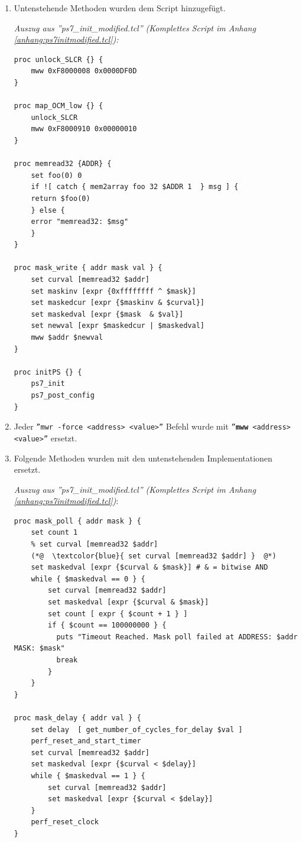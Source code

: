 \begin{enumerate}
\item Untenstehende Methoden wurden dem Script hinzugefügt.

\textit{Auszug aus ''ps7\_init\_modified.tcl'' (Komplettes Script im Anhang \ref{anhang:ps7initmodified.tcl}):}
\lstset{language=tcl}
\begin{lstlisting}[frame=single]
proc unlock_SLCR {} {
	mww 0xF8000008 0x0000DF0D
}

proc map_OCM_low {} {
	unlock_SLCR
	mww 0xF8000910 0x00000010
}

proc memread32 {ADDR} {
    set foo(0) 0
    if ![ catch { mem2array foo 32 $ADDR 1  } msg ] {
	return $foo(0)
    } else {
	error "memread32: $msg"
    }
}

proc mask_write { addr mask val } {
	set curval [memread32 $addr]
	set maskinv [expr {0xffffffff ^ $mask}]
    set maskedcur [expr {$maskinv & $curval}]
	set maskedval [expr {$mask  & $val}]
    set newval [expr $maskedcur | $maskedval]
	mww $addr $newval
}

proc initPS {} {
	ps7_init
	ps7_post_config
}
\end{lstlisting}

\item Jeder \texttt{''mwr -force <address> <value>''} Befehl wurde mit \texttt{''\textbf{mww} <address> <value>''} ersetzt.

\item Folgende Methoden wurden mit den untenstehenden Implementationen ersetzt.

\textit{Auszug aus ''ps7\_init\_modified.tcl'' (Komplettes Script im Anhang \ref{anhang:ps7initmodified.tcl})}:
\lstset{language=tcl}
\begin{lstlisting}[frame=single]
proc mask_poll { addr mask } {
    set count 1
    % set curval [memread32 $addr]
    (*@  \textcolor{blue}{ set curval [memread32 $addr] }  @*)
    set maskedval [expr {$curval & $mask}] # & = bitwise AND
    while { $maskedval == 0 } {
		set curval [memread32 $addr]
        set maskedval [expr {$curval & $mask}]
        set count [ expr { $count + 1 } ]
        if { $count == 100000000 } {
          puts "Timeout Reached. Mask poll failed at ADDRESS: $addr MASK: $mask"
          break
        }
    }
}

proc mask_delay { addr val } {
    set delay  [ get_number_of_cycles_for_delay $val ]
    perf_reset_and_start_timer
    set curval [memread32 $addr]
    set maskedval [expr {$curval < $delay}]
    while { $maskedval == 1 } {
        set curval [memread32 $addr]
        set maskedval [expr {$curval < $delay}]
    }
    perf_reset_clock 
}


\end{lstlisting}
\end{enumerate}
